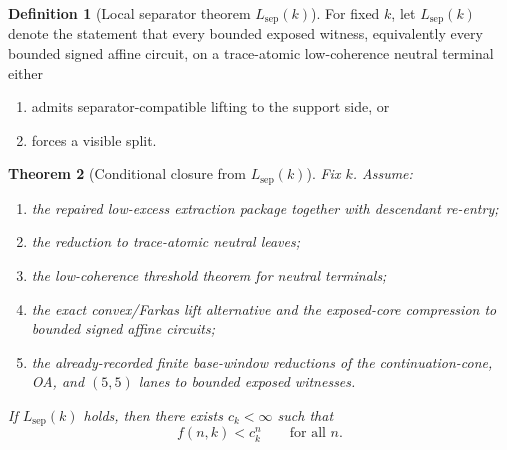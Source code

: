 \documentclass[11pt]{article}
\newtheorem{theorem}{Theorem}[section]
\theoremstyle{definition}
\newtheorem{definition}[theorem]{Definition}
\newcommand{\1}{\mathbf{1}}
\begin{document}
\begin{definition}[Local separator theorem $L_{\mathrm{sep}}(k)$]\label{def:lsep}
For fixed $k$, let $L_{\mathrm{sep}}(k)$ denote the statement that every bounded exposed witness, equivalently every bounded signed affine circuit, on a trace-atomic low-coherence neutral terminal either
\begin{enumerate}[label=(\roman*),leftmargin=2.2em]
\item admits separator-compatible lifting to the support side, or
\item forces a visible split.
\end{enumerate}
\end{definition}

\begin{theorem}[Conditional closure from $L_{\mathrm{sep}}(k)$]\label{thm:lsep-implies-exp}
Fix $k$. Assume:
\begin{enumerate}[label=(\roman*),leftmargin=2.2em]
\item the repaired low-excess extraction package together with descendant re-entry;
\item the reduction to trace-atomic neutral leaves;
\item the low-coherence threshold theorem for neutral terminals;
\item the exact convex/Farkas lift alternative and the exposed-core compression to bounded signed affine circuits;
\item the already-recorded finite base-window reductions of the continuation-cone, OA, and $(5,5)$ lanes to bounded exposed witnesses.
\end{enumerate}
If $L_{\mathrm{sep}}(k)$ holds, then there exists $c_k<\infty$ such that
\[
f(n,k)<c_k^n
\qquad\text{for all }n.
\]
\end{theorem}
\end{document}
